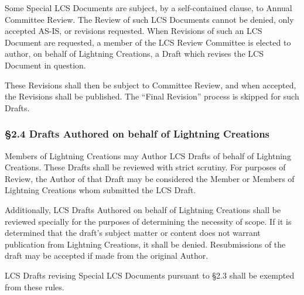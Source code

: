 Some Special LCS Documents are subject, by a self-contained clause, to
Annual Committee Review. The Review of such LCS Documents cannot be
denied, only accepted AS-IS, or revisions requested. When Revisions of
such an LCS Document are requested, a member of the LCS Review Committee
is elected to author, on behalf of Lightning Creations, a Draft which
revises the LCS Document in question.

These Revisions shall then be subject to Committee Review, and when
accepted, the Revisions shall be published. The ``Final Revision''
process is skipped for such Drafts.

\hypertarget{drafts-authored-on-behalf-of-lightning-creations}{%
\subsubsection{§2.4 Drafts Authored on behalf of Lightning
Creations}\label{drafts-authored-on-behalf-of-lightning-creations}}

Members of Lightning Creations may Author LCS Drafts of behalf of
Lightning Creations. These Drafts shall be reviewed with strict
scrutiny. For purposes of Review, the Author of that Draft may be
considered the Member or Members of Lightning Creations whom submitted
the LCS Draft.

Additionally, LCS Drafts Authored on behalf of Lightning Creations shall
be reviewed specially for the purposes of determining the necessity of
scope. If it is determined that the draft's subject matter or content
does not warrant publication from Lightning Creations, it shall be
denied. Resubmissions of the draft may be accepted if made from the
original Author.

LCS Drafts revising Special LCS Documents pursuant to §2.3 shall be
exempted from these rules.
